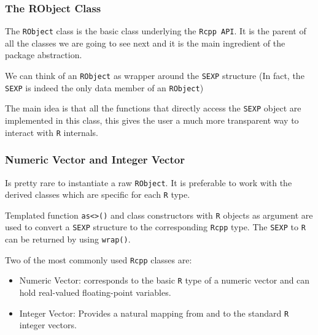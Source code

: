 \documentclass{beamer}
\def\code#1{\texttt{#1}} %
\begin{document}

\begin{frame}

\frametitle{The RObject Class}

The \code{RObject} class is the basic class underlying the \code{Rcpp API}. It is the parent of all the classes we are going to see next and it is the main ingredient of the package abstraction. \pause

\bigskip

We can think of an \code{RObject} as wrapper around the \code{SEXP} structure (In fact, the \code{SEXP} is indeed the only data member of an \code{RObject})  \pause

\bigskip

The main idea is that all the functions that directly access the \code{SEXP} object are implemented in this class, this gives the user a much more transparent way to interact with \code{R} internals.

\end{frame}

	
\begin{frame}
	
\frametitle{Numeric Vector and Integer Vector}	

Is pretty rare to instantiate a raw \code{RObject}. It is preferable to work with the derived classes which are specific for each \code{R} type. \pause

\bigskip

Templated function \code{as<>()} and class constructors with \code{R} objects as argument are used to convert a \code{SEXP} structure to the corresponding \code{Rcpp} type. The \code{SEXP} to \code{R} can be returned by using \code{wrap()}. \pause

\bigskip

Two of the most commonly used \code{Rcpp} classes are:

\begin{itemize}
	\item \alert{Numeric Vector}: corresponds to the basic \code{R} type of a numeric vector and can hold real-valued floating-point variables. \pause
	\item \alert{Integer Vector}: Provides a natural mapping from and to the standard \code{R} integer vectors.
\end{itemize}

\end{frame}
\end{document}
